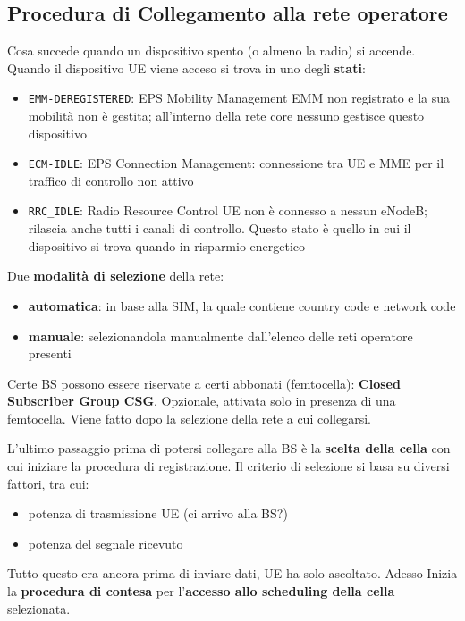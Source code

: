 \subsection{Procedura di Collegamento alla rete operatore}

Cosa succede quando un dispositivo spento (o almeno la radio) si accende. Quando il dispositivo UE viene acceso si trova in uno degli \textbf{stati}: 
\begin{itemize}
	\item \texttt{EMM-DEREGISTERED}: EPS Mobility Management EMM non registrato e la sua mobilità non è gestita; all'interno della rete core nessuno gestisce questo dispositivo

	\item \texttt{ECM-IDLE}: EPS Connection Management: connessione tra UE e MME per il traffico di controllo non attivo

	\item \texttt{RRC\_IDLE}: Radio Resource Control UE non è connesso a nessun eNodeB; rilascia anche tutti i canali di controllo. Questo stato è quello in cui il dispositivo si trova quando in risparmio energetico
\end{itemize}

Due \textbf{modalità di selezione} della rete: 
\begin{itemize}
	\item \textbf{automatica}: in base alla SIM, la quale contiene country code e network code

	\item \textbf{manuale}: selezionandola manualmente dall'elenco delle reti operatore presenti
\end{itemize}

Certe BS possono essere riservate a certi abbonati (femtocella): \textbf{Closed Subscriber Group CSG}. Opzionale, attivata solo in presenza di una femtocella. Viene fatto dopo la selezione della rete a cui collegarsi.

L'ultimo passaggio prima di potersi collegare alla BS è la \textbf{scelta della cella} con cui iniziare la procedura di registrazione. Il criterio di selezione si basa su diversi fattori, tra cui: 
\begin{itemize}
	\item potenza di trasmissione UE (ci arrivo alla BS?)
	
    \item potenza del segnale ricevuto
\end{itemize}

Tutto questo era ancora prima di inviare dati, UE ha solo ascoltato. Adesso Inizia la \textbf{procedura di contesa} per l'\textbf{accesso allo scheduling della cella} selezionata.

